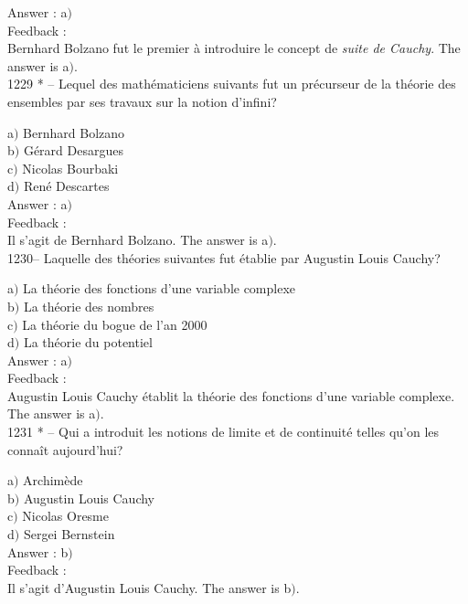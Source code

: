 \documentclass[letterpaper, 12pt]{article}
\begin{document}
Answer : a$)$\\

Feedback : \\
Bernhard Bolzano fut le premier \`a introduire le concept de {\sl
suite de Cauchy}.
The answer is a$)$.\\

1229 * -- Lequel des math\'ematiciens suivants fut un pr\'ecurseur
de la th\'eorie des ensembles par ses travaux sur la notion
d'infini?

a$)$ Bernhard Bolzano \\
b$)$ G\'erard Desargues \\
c$)$ Nicolas Bourbaki \\
d$)$ Ren\'e Descartes\\

Answer : a$)$\\

Feedback : \\
Il s'agit de Bernhard Bolzano.
The answer is a$)$.\\

1230-- Laquelle des th\'eories suivantes fut \'etablie par Augustin
Louis Cauchy?

a$)$ La th\'eorie des fonctions d'une variable complexe \\
b$)$ La th\'eorie des nombres \\
c$)$ La th\'eorie du bogue de l'an 2000 \\
d$)$ La th\'eorie du potentiel\\

Answer : a$)$\\

Feedback : \\
Augustin Louis Cauchy \'etablit la th\'eorie des fonctions d'une
variable complexe.
The answer is a$)$.\\

1231 * -- Qui a introduit les notions de limite et de continuit\'e
telles qu'on les conna\^it aujourd'hui?

a$)$ Archim\`ede \\
b$)$ Augustin Louis Cauchy \\
c$)$ Nicolas Oresme \\
d$)$ Sergei Bernstein\\

Answer : b$)$\\

Feedback : \\
Il s'agit d'Augustin Louis Cauchy.
The answer is b$)$.\\
\end{document}
